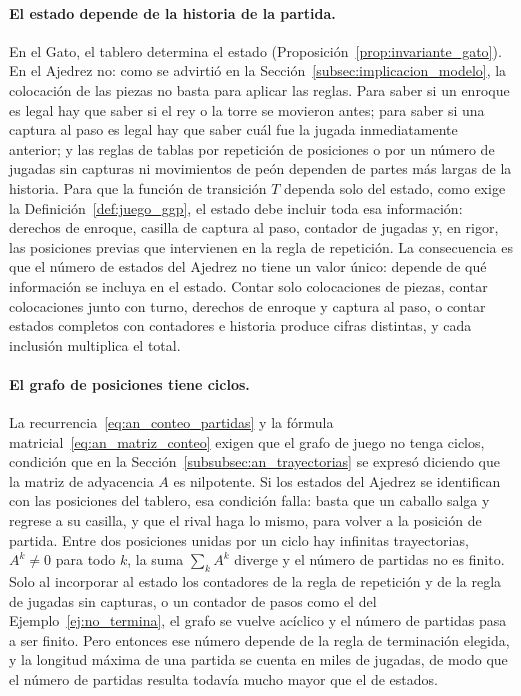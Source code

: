 \paragraph{El estado depende de la historia de la partida.} En el Gato, el tablero determina el estado (Proposición~\ref{prop:invariante_gato}). En el Ajedrez no: como se advirtió en la Sección~\ref{subsec:implicacion_modelo}, la colocación de las piezas no basta para aplicar las reglas. Para saber si un enroque es legal hay que saber si el rey o la torre se movieron antes; para saber si una captura al paso es legal hay que saber cuál fue la jugada inmediatamente anterior; y las reglas de tablas por repetición de posiciones o por un número de jugadas sin capturas ni movimientos de peón dependen de partes más largas de la historia. Para que la función de transición $T$ dependa solo del estado, como exige la Definición~\ref{def:juego_ggp}, el estado debe incluir toda esa información: derechos de enroque, casilla de captura al paso, contador de jugadas y, en rigor, las posiciones previas que intervienen en la regla de repetición. La consecuencia es que el número de estados del Ajedrez no tiene un valor único: depende de qué información se incluya en el estado. Contar solo colocaciones de piezas, contar colocaciones junto con turno, derechos de enroque y captura al paso, o contar estados completos con contadores e historia produce cifras distintas, y cada inclusión multiplica el total.

\paragraph{El grafo de posiciones tiene ciclos.} La recurrencia~\eqref{eq:an_conteo_partidas} y la fórmula matricial~\eqref{eq:an_matriz_conteo} exigen que el grafo de juego no tenga ciclos, condición que en la Sección~\ref{subsubsec:an_trayectorias} se expresó diciendo que la matriz de adyacencia $A$ es nilpotente. Si los estados del Ajedrez se identifican con las posiciones del tablero, esa condición falla: basta que un caballo salga y regrese a su casilla, y que el rival haga lo mismo, para volver a la posición de partida. Entre dos posiciones unidas por un ciclo hay infinitas trayectorias, $A^k \neq 0$ para todo $k$, la suma $\sum_k A^k$ diverge y el número de partidas no es finito. Solo al incorporar al estado los contadores de la regla de repetición y de la regla de jugadas sin capturas, o un contador de pasos como el del Ejemplo~\ref{ej:no_termina}, el grafo se vuelve acíclico y el número de partidas pasa a ser finito. Pero entonces ese número depende de la regla de terminación elegida, y la longitud máxima de una partida se cuenta en miles de jugadas, de modo que el número de partidas resulta todavía mucho mayor que el de estados.


